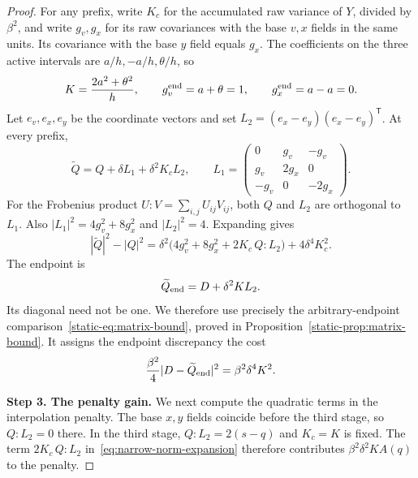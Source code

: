 \begin{proof}
For any prefix, write $K_c$ for the accumulated raw variance of
$Y$, divided by $\beta^2$, and write $g_v,g_x$ for its raw
covariances with the base $v,x$ fields in the same units. Its
covariance with the base $y$ field equals $g_x$. The coefficients
on the three active intervals are $a/h,-a/h,\theta/h$, so
\begin{equation}\label{eq:narrow-covariance-end}
 K=\frac{2a^2+\theta^2}{h},\qquad
 g_v^{\rm end}=a+\theta=1,\qquad g_x^{\rm end}=a-a=0.
\end{equation}
Let $e_v,e_x,e_y$ be the coordinate vectors and set
$L_2=(e_x-e_y)(e_x-e_y)^{\mathsf T}$. At every prefix,
\begin{equation}\label{eq:narrow-covariance-expansion}
 \widetilde Q=Q+\delta L_1+\delta^2K_cL_2,
 \qquad
 L_1=
 \begin{pmatrix}
 0&g_v&-g_v\\
 g_v&2g_x&0\\
 -g_v&0&-2g_x
 \end{pmatrix}.
\end{equation}
For the Frobenius product $U:V=\sum_{i,j}U_{ij}V_{ij}$, both $Q$
and $L_2$ are orthogonal to $L_1$. Also
$|L_1|^2=4g_v^2+8g_x^2$ and $|L_2|^2=4$. Expanding gives
\begin{equation}\label{eq:narrow-norm-expansion}
 |\widetilde Q|^2-|Q|^2
 =\delta^2\bigl(4g_v^2+8g_x^2+2K_c\,Q:L_2\bigr)
   +4\delta^4K_c^2.
\end{equation}
The endpoint is
\begin{equation}\label{eq:narrow-modified-end}
 \widetilde Q_{\rm end}=D+\delta^2K L_2.
\end{equation}
Its diagonal need not be one. We therefore use precisely the
arbitrary-endpoint comparison~\eqref{static-eq:matrix-bound}, proved
in Proposition~\ref{static-prop:matrix-bound}. It assigns the
endpoint discrepancy the cost
\begin{equation}\label{eq:narrow-mismatch}
 \frac{\beta^2}{4}|D-\widetilde Q_{\rm end}|^2
 =\beta^2\delta^4K^2.
\end{equation}

\par\medskip\noindent\textbf{Step 3. The penalty gain.}\enspace
We next compute the quadratic terms in the interpolation penalty.
The base $x,y$ fields coincide before the third stage, so $Q:L_2=0$
there. In the third stage, $Q:L_2=2(s-q)$ and $K_c=K$ is fixed.
The term $2K_c\,Q:L_2$ in~\eqref{eq:narrow-norm-expansion}
therefore contributes $\beta^2\delta^2K A(q)$ to the penalty.


\end{proof}
